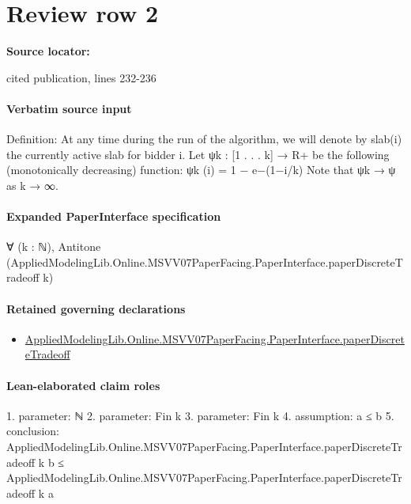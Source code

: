 \documentclass[10pt]{article}
\begin{document}
\section*{Review row 2}
\textbf{Source locator:} {\footnotesize\raggedright cited publication, lines 232-\allowbreak{}236\par}
\paragraph{Verbatim source input}
\begin{ReviewVerbatim}
Definition: At any time during the run of the algorithm, we will denote by slab(i) the
currently active slab for bidder i.
Let ψk : [1 . . . k] → R+ be the following (monotonically decreasing) function:
ψk (i) = 1 − e−(1−i/k)
Note that ψk → ψ as k → ∞.
\end{ReviewVerbatim}



\paragraph{Expanded PaperInterface specification}
\begin{ReviewVerbatim}
∀ (k : ℕ), Antitone (AppliedModelingLib.Online.MSVV07PaperFacing.PaperInterface.paperDiscreteTradeoff k)
\end{ReviewVerbatim}

\paragraph{Retained governing declarations}
\begin{itemize}\raggedright
\item \hyperlink{governing-declaration-396ea3a99753fcc5}{Applied\allowbreak{}Modeling\allowbreak{}Lib.\allowbreak{}Online.\allowbreak{}MSVV07\allowbreak{}Paper\allowbreak{}Facing.\allowbreak{}Paper\allowbreak{}Interface.\allowbreak{}paper\allowbreak{}Discrete\allowbreak{}Tradeoff}
\end{itemize}
\paragraph{Lean-elaborated claim roles}\begin{ReviewVerbatim}
1. parameter: ℕ
2. parameter: Fin k
3. parameter: Fin k
4. assumption: a ≤ b
5. conclusion: AppliedModelingLib.Online.MSVV07PaperFacing.PaperInterface.paperDiscreteTradeoff k b ≤
  AppliedModelingLib.Online.MSVV07PaperFacing.PaperInterface.paperDiscreteTradeoff k a
\end{ReviewVerbatim}
\end{document}
